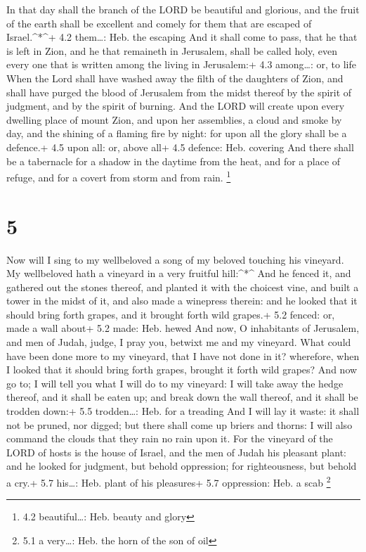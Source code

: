  In that day shall the branch of the LORD be beautiful and
glorious, and the fruit of the earth shall be excellent and comely for
them that are escaped of Israel.\^{}*\^{}+ 4.2 them\ldots: Heb. the
escaping  And it shall come to pass, that he that is left in
Zion, and he that remaineth in Jerusalem, shall be called holy, even
every one that is written among the living in Jerusalem:+ 4.3
among\ldots: or, to life  When the Lord shall have washed
away the filth of the daughters of Zion, and shall have purged the blood
of Jerusalem from the midst thereof by the spirit of judgment, and by
the spirit of burning.  And the LORD will create upon every
dwelling place of mount Zion, and upon her assemblies, a cloud and smoke
by day, and the shining of a flaming fire by night: for upon all the
glory shall be a defence.+ 4.5 upon all: or, above all+ 4.5 defence:
Heb. covering  And there shall be a tabernacle for a shadow
in the daytime from the heat, and for a place of refuge, and for a
covert from storm and from rain. \footnote{4.2 beautiful\ldots: Heb.
  beauty and glory}

\hypertarget{section-4}{%
\section{5}\label{section-4}}

 Now will I sing to my wellbeloved a song of my beloved
touching his vineyard. My wellbeloved hath a vineyard in a very fruitful
hill:\^{}*\^{}  And he fenced it, and gathered out the
stones thereof, and planted it with the choicest vine, and built a tower
in the midst of it, and also made a winepress therein: and he looked
that it should bring forth grapes, and it brought forth wild grapes.+
5.2 fenced: or, made a wall about+ 5.2 made: Heb. hewed  And
now, O inhabitants of Jerusalem, and men of Judah, judge, I pray you,
betwixt me and my vineyard.  What could have been done more
to my vineyard, that I have not done in it? wherefore, when I looked
that it should bring forth grapes, brought it forth wild grapes?
 And now go to; I will tell you what I will do to my
vineyard: I will take away the hedge thereof, and it shall be eaten up;
and break down the wall thereof, and it shall be trodden down:+ 5.5
trodden\ldots: Heb. for a treading  And I will lay it waste:
it shall not be pruned, nor digged; but there shall come up briers and
thorns: I will also command the clouds that they rain no rain upon it.
 For the vineyard of the LORD of hosts is the house of
Israel, and the men of Judah his pleasant plant: and he looked for
judgment, but behold oppression; for righteousness, but behold a cry.+
5.7 his\ldots: Heb. plant of his pleasures+ 5.7 oppression: Heb. a scab
\footnote{5.1 a very\ldots: Heb. the horn of the son of oil}

